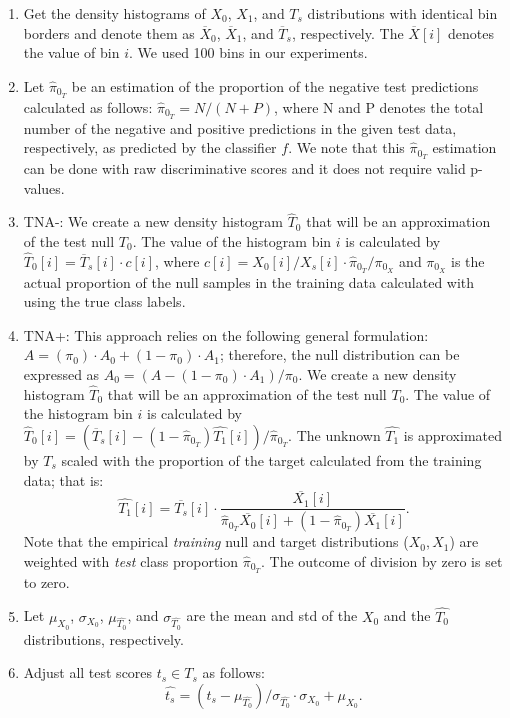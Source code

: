 \documentclass[10pt,letterpaper]{article}
\begin{document}
\begin{enumerate}%
	\itemsep-3pt  		
	\item [1.] Get the density histograms of $X_0$, $X_1$, and $T_s$ distributions with identical bin borders and denote them as $\overline{X}_0$, $\overline{X}_1$, and $\overline{T}_s$, respectively.
	The $\overline{X}[i]$ denotes the value of bin $i$.
	We used 100 bins in our experiments.
	
	\item [2.] Let $\hat{\pi}_{0_T}$ be an estimation of the proportion of the negative test predictions calculated as follows:  $\hat{\pi}_{0_T} = N/(N+P)$, where N and P denotes the total number of the negative and positive predictions in the given test data, respectively, as predicted by the classifier $f$.
	We note that this $\hat{\pi}_{0_T}$ estimation can be done with raw discriminative scores and it does not require valid p-values.
	
	\item [3a.] TNA-:  We create a new density histogram $\hat{T}_0$ that will be an approximation of the test null $T_0$.
	The value of the histogram bin $i$ is calculated  by $\hat{T}_0[i] = \overline{T}_s[i]\cdot c[i]$, where  $c[i]=X_0[i]/X_s[i]\cdot \hat{\pi}_{0_T}/\pi_{0_X}$ and $\pi_{0_X}$ is the actual proportion of the null samples in the training data calculated with using the true class labels.
	
	\item [3b.] TNA+: This approach relies on the following general formulation: $A = (\pi_0) \cdot A_0 + (1-\pi_0) \cdot A_1$; therefore, the null distribution can be expressed as $A_0 = (A - (1-\pi_0) \cdot A_1)/\pi_0$.
	We create a new density histogram $\hat{T}_0$ that will be an approximation of the test null $T_0$.
	The value of the histogram bin $i$ is calculated  by $\hat{T}_0[i] = (\overline{T}_s[i] -  (1-\hat{\pi}_{0_T})\hat{T_1}[i])/\hat{\pi}_{0_T}$.
	The unknown $\hat{T_1}$ is approximated by $T_s$ scaled with the proportion of the target calculated from the training data; that is:  $$\hat{T_1}[i] = \overline{T_s}[i]\cdot \frac {\overline{X_1}[i]}{\hat{\pi}_{0_T} \overline{X_0}[i] + (1-\hat{\pi}_{0_T}) \overline{X_1}[i]}.$$ Note that the empirical {\em training} null and target distributions ($X_0, X_1$) are weighted with {\em test} class proportion  $\hat{\pi}_{0_T}$.
	The outcome of division by zero is set to zero.
		
	\item [4.] Let $\mu_{X_0}$, $\sigma_{X_0}$, $\mu_{\hat{T_0}}$, and $\sigma_{\hat{T_0}}$ are the mean and std of the $X_0$ and the $\hat{T_0}$ distributions, respectively. 
	
	\item [5.] Adjust all test scores $t_s\in T_s$ as follows:
	$$\hat{t_s} = (t_s-\mu_{\hat{T_0}})/\sigma_{\hat{T_0}} \cdot \sigma_{X_0} + \mu_{X_0}.$$
\end{enumerate}
\end{document}
